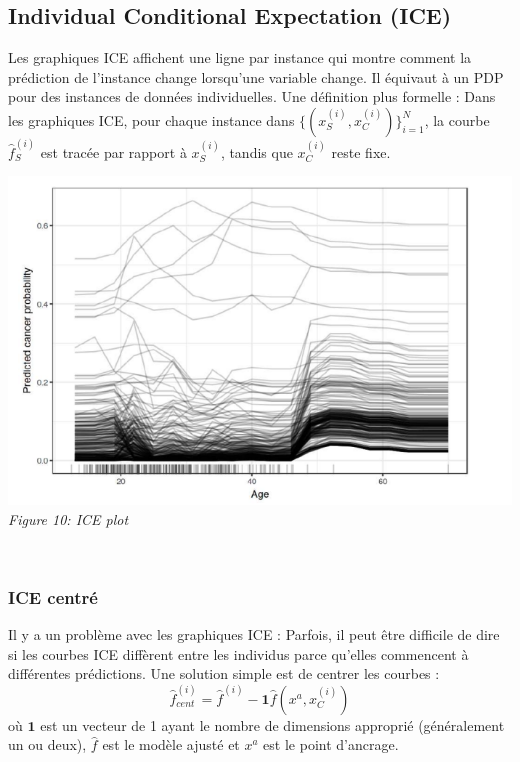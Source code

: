 \subsection{Individual Conditional Expectation (ICE)}
Les graphiques ICE affichent une ligne par instance qui montre comment la prédiction de l'instance change lorsqu'une variable change. Il équivaut à un PDP pour des instances de données individuelles.
Une définition plus formelle :
Dans les graphiques ICE, pour chaque instance dans \( \{(x_{S}^{(i)},x_{C}^{(i)})\}_{i=1}^N \), la courbe \( \hat{f}_S^{(i)} \) est tracée par rapport à \( x^{(i)}_{S} \), tandis que \( x^{(i)}_{C} \) reste fixe.


\begin{center}
    \centering
    \includegraphics[width=0.7\linewidth]{Images/ice.png}
    \\
    \emph{Figure 10: ICE plot}
    \\
\end{center}
\\


\subsubsection{ICE centré}
Il y a un problème avec les graphiques ICE :
Parfois, il peut être difficile de dire si les courbes ICE diffèrent entre les individus parce qu'elles commencent à différentes prédictions. Une solution simple est de centrer les courbes :
\[ \hat{f}_{cent}^{(i)} = \hat{f}^{(i)} - \mathbf{1}\hat{f}(x^{a},x^{(i)}_{C}) \]
où \( \mathbf{1} \) est un vecteur de 1 ayant le nombre de dimensions approprié (généralement un ou deux), \( \hat{f} \) est le modèle ajusté et \( x^a \) est le point d'ancrage.


